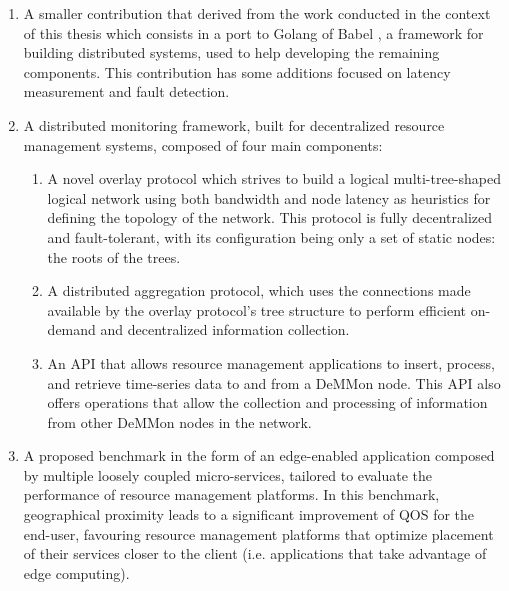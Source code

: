 \begin{enumerate}

    \item A smaller contribution that derived from the work conducted in the context of this thesis which consists in a port to Golang of Babel \cite{babel}, a framework for building distributed systems, used to help developing the remaining components. This contribution has some additions focused on latency measurement and fault detection.

    \item A distributed monitoring framework, built for decentralized resource management systems, composed of four main components: {
        \begin{enumerate}

            \item A novel overlay protocol which strives to build a logical multi-tree-shaped logical network using both bandwidth and node latency as heuristics for defining the topology of the network. This protocol is fully decentralized and fault-tolerant, with its configuration being only a set of static nodes: the roots of the trees.
            
            \item A distributed aggregation protocol, which uses the connections made available by the overlay protocol's tree structure to perform efficient on-demand and decentralized information collection.
            
            \item An API that allows resource management applications to insert, process, and retrieve time-series data to and from a DeMMon node. This API also offers operations that allow the collection and processing of information from other DeMMon nodes in the network. 
            
        \end{enumerate}
        }
            
    \item A proposed benchmark in the form of an edge-enabled application composed by multiple loosely coupled micro-services, tailored to evaluate the performance of resource management platforms. In this benchmark, geographical proximity leads to a significant improvement of QOS for the end-user, favouring resource management platforms that optimize placement of their services closer to the client (i.e. applications that take advantage of edge computing).
    

\end{enumerate}
